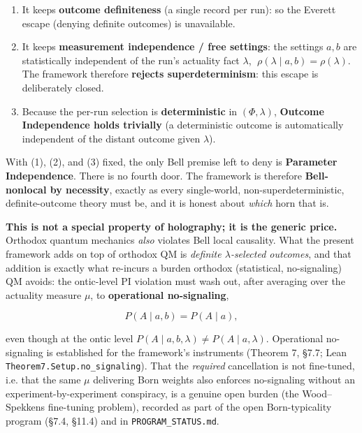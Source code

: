 \documentclass[11pt,a4paper]{article}
\begin{document}
\begin{enumerate}
  \item It keeps \textbf{outcome definiteness} (a single record per run): so the Everett escape (denying definite outcomes) is unavailable.
  \item It keeps \textbf{measurement independence / free settings}: the settings $a,b$ are statistically independent of the run's actuality fact $\lambda$, $\;\rho(\lambda\mid a,b)=\rho(\lambda)$. The framework therefore \textbf{rejects superdeterminism}: this escape is deliberately closed.
  \item Because the per-run selection is \textbf{deterministic} in $(\Phi,\lambda)$, \textbf{Outcome Independence holds trivially} (a deterministic outcome is automatically independent of the distant outcome given $\lambda$).
\end{enumerate}

With (1), (2), and (3) fixed, the only Bell premise left to deny is \textbf{Parameter Independence}. There is no fourth door. The framework is therefore \textbf{Bell-nonlocal by necessity}, exactly as every single-world, non-superdeterministic, definite-outcome theory must be, and it is honest about \emph{which} horn that is.

\textbf{This is not a special property of holography; it is the generic price.} Orthodox quantum mechanics \emph{also} violates Bell local causality. What the present framework adds on top of orthodox QM is \emph{definite $\lambda$-selected outcomes}, and that addition is exactly what re-incurs a burden orthodox (statistical, no-signaling) QM avoids: the ontic-level PI violation must wash out, after averaging over the actuality measure $\mu$, to \textbf{operational no-signaling},

\[
P(A\mid a,b) = P(A\mid a),
\]

even though at the ontic level $P(A\mid a,b,\lambda)\neq P(A\mid a,\lambda)$. Operational no-signaling is established for the framework's instruments (Theorem 7, §7.7; Lean \texttt{Theorem7.Setup.no\_signaling}). That the \emph{required} cancellation is not fine-tuned, i.e. that the same $\mu$ delivering Born weights also enforces no-signaling without an experiment-by-experiment conspiracy, is a genuine open burden (the Wood–Spekkens fine-tuning problem), recorded as part of the open Born-typicality program (§7.4, §11.4) and in \texttt{PROGRAM\_STATUS.md}.
\end{document}
